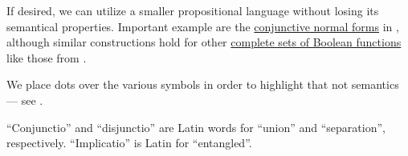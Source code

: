 \begin{comments}
  \item If desired, we can utilize a smaller propositional language without losing its semantical properties. Important example are the \hyperref[def:cnf_and_dnf]{conjunctive normal forms} in , although similar constructions hold for other \hyperref[def:boolean_closure/complete]{complete sets of Boolean functions} like those from .

  \item We place dots over the various symbols in order to highlight that not semantics --- see .

  \item \enquote{Conjunctio} and \enquote{disjunctio} are Latin words for \enquote{union} and \enquote{separation}, respectively. \enquote{Implicatio} is Latin for \enquote{entangled}.
\end{comments}

